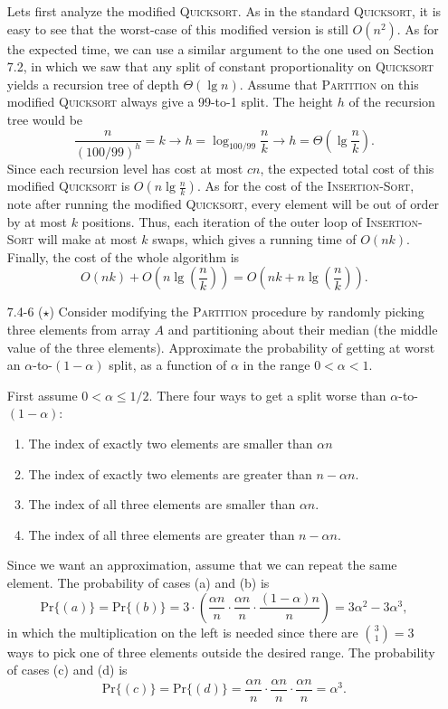 \begin{enumerate}
\begin{framed}
Lets first analyze the modified \textsc{Quicksort}. As in the standard
\textsc{Quicksort}, it is easy to see that the worst-case of this modified
version is still $O(n^2)$. As for the expected time, we can use a similar
argument to the one used on Section 7.2, in which we saw that any split of
constant proportionality on \textsc{Quicksort} yields a recursion tree of
depth $\Theta(\lg n)$. Assume that \textsc{Partition} on this modified
\textsc{Quicksort} always give a 99-to-1 split. The height $h$ of the recursion
tree would be
\[
  \frac{n}{(100/99)^h} = k \rightarrow h = \log_{100/99} \frac{n}{k} \rightarrow h = \Theta\left(\lg \frac{n}{k}\right).
\]
Since each recursion level has cost at most $cn$, the expected total cost of
this modified \textsc{Quicksort} is $O(n \lg \frac{n}{k})$. As for the cost of
the \textsc{Insertion-Sort}, note after running the modified \textsc{Quicksort},
every element will be out of order by at most $k$ positions. Thus, each
iteration of the outer loop of \textsc{Insertion-Sort} will make at most $k$
swaps, which gives a running time of $O(nk)$. Finally, the cost of the whole
algorithm is
\[
  O(nk) + O\left(n \lg \left(\frac{n}{k}\right)\right) = O\left(nk + n \lg \left(\frac{n}{k}\right)\right).
\]
\end{framed}

\newpage

\item[7.4{-}6]{($\star$) Consider modifying the \textsc{Partition} procedure by
randomly picking three elements from array $A$ and partitioning about their
median (the middle value of the three elements). Approximate the probability of
getting at worst an $\alpha$-to-$(1 - \alpha)$ split, as a function of
$\alpha$ in the range $0 < \alpha < 1$.}

\begin{framed}
First assume $0 < \alpha \le 1/2$. There four ways to get a split worse than
$\alpha$-to-$(1 - \alpha)$:
\begin{enumerate}
  \item The index of exactly two elements are smaller than $\alpha n$
  \item The index of exactly two elements are greater than $n - \alpha n$.
  \item The index of all three elements are smaller than $\alpha n$.
  \item The index of all three elements are greater than $n - \alpha n$.
\end{enumerate}
Since we want an approximation, assume that we can repeat the same element. The
probability of cases (a) and (b) is
\[
  \text{Pr}\{(a)\} = \text{Pr}\{(b)\} =
  3 \cdot \left(\frac{\alpha n}{n} \cdot \frac{\alpha n}{n} \cdot
                \frac{(1 - \alpha) n}{n}\right) =
  3 \alpha^2 - 3 \alpha^3,
\]
in which the multiplication on the left is needed since there are
$\binom{3}{1} = 3$ ways to pick one of three elements outside the desired range.
The probability of cases (c) and (d) is
\[
  \text{Pr}\{(c)\} = \text{Pr}\{(d)\} =
  \frac{\alpha n}{n} \cdot \frac{\alpha n}{n} \cdot \frac{\alpha n}{n} =
  \alpha^3.
\]


\end{framed}
\end{enumerate}
